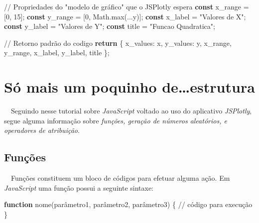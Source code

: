 \documentclass[
  portuguese,
  letterpaper,
  DIV=11,
  numbers=noendperiod]{scrreprt}
\newenvironment{Shaded}{\begin{snugshade}}{\end{snugshade}}
\newcommand{\BuiltInTok}[1]{\textcolor[rgb]{0.00,0.23,0.31}{#1}}
\newcommand{\CommentTok}[1]{\textcolor[rgb]{0.37,0.37,0.37}{#1}}
\newcommand{\ControlFlowTok}[1]{\textcolor[rgb]{0.00,0.23,0.31}{\textbf{#1}}}
\newcommand{\DataTypeTok}[1]{\textcolor[rgb]{0.68,0.00,0.00}{#1}}
\newcommand{\DecValTok}[1]{\textcolor[rgb]{0.68,0.00,0.00}{#1}}
\newcommand{\FunctionTok}[1]{\textcolor[rgb]{0.28,0.35,0.67}{#1}}
\newcommand{\KeywordTok}[1]{\textcolor[rgb]{0.00,0.23,0.31}{\textbf{#1}}}
\newcommand{\NormalTok}[1]{\textcolor[rgb]{0.00,0.23,0.31}{#1}}
\newcommand{\OperatorTok}[1]{\textcolor[rgb]{0.37,0.37,0.37}{#1}}
\newcommand{\StringTok}[1]{\textcolor[rgb]{0.13,0.47,0.30}{#1}}
\begin{document}
\begin{Shaded}
\begin{Highlighting}[]
\CommentTok{// Propriedades do "modelo de gráfico" que o JSPlotly espera}
\KeywordTok{const}\NormalTok{ x\_range }\OperatorTok{=}\NormalTok{ [}\DecValTok{0}\OperatorTok{,} \DecValTok{15}\NormalTok{]}\OperatorTok{;}
\KeywordTok{const}\NormalTok{ y\_range }\OperatorTok{=}\NormalTok{ [}\DecValTok{0}\OperatorTok{,} \BuiltInTok{Math}\OperatorTok{.}\FunctionTok{max}\NormalTok{(}\OperatorTok{...}\NormalTok{y)]}\OperatorTok{;}
\KeywordTok{const}\NormalTok{ x\_label }\OperatorTok{=} \StringTok{"Valores de X"}\OperatorTok{;}
\KeywordTok{const}\NormalTok{ y\_label }\OperatorTok{=} \StringTok{"Valores de Y"}\OperatorTok{;}
\KeywordTok{const}\NormalTok{ title   }\OperatorTok{=} \StringTok{"Funcao Quadratica"}\OperatorTok{;}

\CommentTok{// Retorno padrão do codigo}
\ControlFlowTok{return}\NormalTok{ \{ }\DataTypeTok{x\_values}\OperatorTok{:}\NormalTok{ x}\OperatorTok{,} \DataTypeTok{y\_values}\OperatorTok{:}\NormalTok{ y}\OperatorTok{,}\NormalTok{ x\_range}\OperatorTok{,}\NormalTok{ y\_range}\OperatorTok{,}\NormalTok{ x\_label}\OperatorTok{,}\NormalTok{ y\_label}\OperatorTok{,}\NormalTok{ title \}}\OperatorTok{;}
\end{Highlighting}
\end{Shaded}


\chapter{Só mais um poquinho
de\ldots estrutura}\label{suxf3-mais-um-poquinho-deestrutura}

~~Seguindo nesse tutorial sobre \emph{JavaScript} voltado ao uso do
aplicativo \emph{JSPlotly}, segue alguma informação sobre \emph{funções,
geração de números aleatórios, e operadores de atribuição}.

\hfill\break

\section{Funções}\label{funuxe7uxf5es}

~~Funções constituem um bloco de códigos para efetuar alguma ação. Em
\emph{JavaScript} uma função possui a seguinte sintaxe:

\begin{Shaded}
\begin{Highlighting}[]
\KeywordTok{function} \FunctionTok{nome}\NormalTok{(parâmetro1}\OperatorTok{,}\NormalTok{ parâmetro2}\OperatorTok{,}\NormalTok{ parâmetro3) \{}
  \CommentTok{// código para execução}
\NormalTok{\}}
\end{Highlighting}
\end{Shaded}
\end{document}
